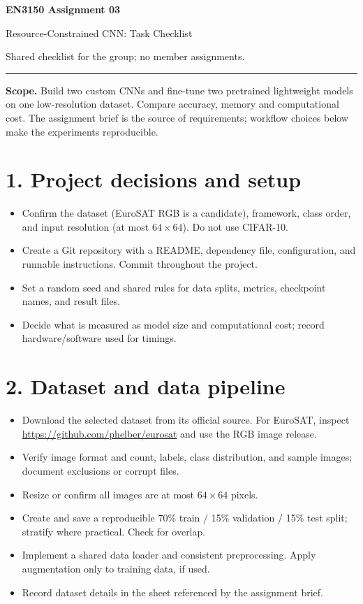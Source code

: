\documentclass[11pt,a4paper]{article}
\newcommand{\task}[1]{\item[$\square$] #1}
\newcommand{\phase}[1]{\Needspace{8\baselineskip}\section*{\color{accent}#1}}
\begin{document}
\begin{center}
{\LARGE\bfseries EN3150 Assignment 03}\par
{\Large Resource-Constrained CNN: Task Checklist}\par
\vspace{3pt}
{\small Shared checklist for the group; no member assignments.}\par
\end{center}
\vspace{-6pt}
\hrule
\vspace{6pt}
\textbf{Scope.} Build two custom CNNs and fine-tune two pretrained lightweight models on one low-resolution dataset. Compare accuracy, memory and computational cost. The assignment brief is the source of requirements; workflow choices below make the experiments reproducible.

\phase{1. Project decisions and setup}
\begin{itemize}
\task{Confirm the dataset (EuroSAT RGB is a candidate), framework, class order, and input resolution (at most $64\times64$). Do not use CIFAR-10.}
\task{Create a Git repository with a README, dependency file, configuration, and runnable instructions. Commit throughout the project.}
\task{Set a random seed and shared rules for data splits, metrics, checkpoint names, and result files.}
\task{Decide what is measured as model size and computational cost; record hardware/software used for timings.}
\end{itemize}

\phase{2. Dataset and data pipeline}
\begin{itemize}
\task{Download the selected dataset from its official source. For EuroSAT, inspect \url{https://github.com/phelber/eurosat} and use the RGB image release.}
\task{Verify image format and count, labels, class distribution, and sample images; document exclusions or corrupt files.}
\task{Resize or confirm all images are at most $64\times64$ pixels.}
\task{Create and save a reproducible 70\% train / 15\% validation / 15\% test split; stratify where practical. Check for overlap.}
\task{Implement a shared data loader and consistent preprocessing. Apply augmentation only to training data, if used.}
\task{Record dataset details in the sheet referenced by the assignment brief.}
\end{itemize}
\end{document}
